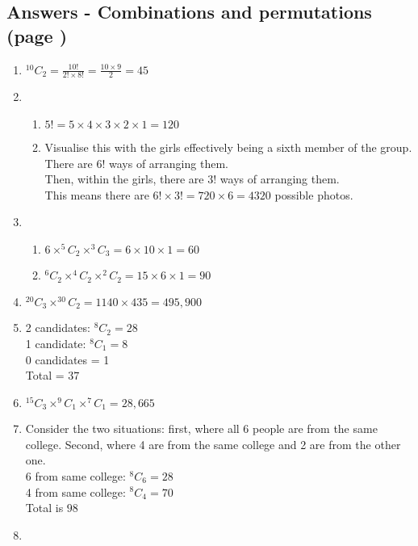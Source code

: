 \documentclass[../main.tex]{subfiles}
\begin{document}
\subsection*{Answers - Combinations and permutations (page \pageref{Combinations and permuations})}

\begin{enumerate}
    \item
    \(^{10}C_2=\frac{10!}{2!\times 8!}=\frac{10\times 9}{2}=45\)
    \item 
        \begin{enumerate}
            \item 
            \(5!=5\times 4\times 3\times 2\times 1=120\)
            \item 
            Visualise this with the girls effectively being a sixth member of the group. There are \(6!\) ways of arranging them.\\
            Then, within the girls, there are \(3!\) ways of arranging them.\\
            This means there are \(6! \times 3!=720\times 6=4320\) possible photos.
        \end{enumerate}
    \item 
        \begin{enumerate}
            \item 
            \(6\times ^5C_2 \times ^3C_3 =6\times 10\times 1=60\)
            \item 
            \(^6C_2 \times ^4C_2 \times ^2C_2 = 15\times 6\times 1=90\)
        \end{enumerate}
    \item 
    \( ^{20}C_3\times ^{30}C_2 = 1140\times 435=495,900 \)
    \item 
    2 candidates: \(^8C_2 = 28\)\\
    1 candidate: \(^8C_1 = 8\)\\
    0 candidates  = 1\\
    Total = \(37\)
    \item 
    \(^{15}C_3 \times ^9C_1 \times ^7C_1 = 28,665\)
    \item 
    Consider the two situations: first, where all 6 people are from the same college. Second, where 4 are from the same college and 2 are from the other one.\\
    6 from same college: \(^8C_6=28\)\\
    4 from same college: \(^8C_4=70\)\\
    Total is \(98\)
    \item 

\end{enumerate}
\end{document}
